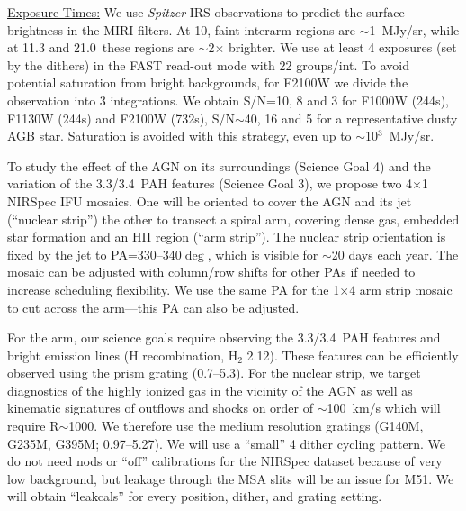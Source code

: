 \documentclass[12pt]{article}
\begin{document}
\vspace{0.05in}

\noindent \underline{Exposure Times:} We use {\em Spitzer} IRS observations to predict the surface brightness in the MIRI filters. At 10\micron, faint interarm regions are $\sim$1~MJy/sr, while at 11.3 and 21.0\micron\ these regions are $\sim$2$\times$ brighter.  We use at least 4 exposures (set by the dithers) in the FAST read-out mode with 22 groups/int. To avoid potential saturation from bright backgrounds, for F2100W we divide the observation into 3 integrations. We obtain S/N=10, 8 and 3 for F1000W (244s), F1130W (244s) and F2100W (732s), S/N$\sim$40, 16 and 5 for a representative dusty AGB star.  Saturation is avoided with this strategy, even up to $\sim$10$^3$~MJy/sr.

\vspace{0.1in}

 To study the effect of the AGN on its surroundings (Science Goal 4) and the variation of the 3.3/3.4\micron\ PAH features (Science Goal 3), we propose two 4$\times$1 NIRSpec IFU mosaics. One will be oriented to cover the AGN and its jet (``nuclear strip'') the other to transect a spiral arm, covering dense gas, embedded star formation and an H{\small II} region (``arm strip''). The nuclear strip orientation is fixed by the jet to PA=330--340$\deg$, which is visible for $\sim$20 days each year. The mosaic can be adjusted with column/row shifts for other PAs if needed to increase scheduling flexibility. We use the same PA for the 1$\times$4 arm strip mosaic to cut across the arm---this PA can also be adjusted.

For the arm, our science goals require observing the 3.3/3.4\micron\ PAH features and bright emission lines (H recombination, H$_2$ 2.12\micron). These features can be efficiently observed using the prism grating (0.7--5.3\micron).  For the nuclear strip, we target diagnostics of the highly ionized gas in the vicinity of the AGN as well as kinematic signatures of outflows and shocks on order of $\sim$100~km/s which will require R$\sim$1000. We therefore use the medium resolution gratings (G140M, G235M, G395M; 0.97--5.27\micron). We will use a ``small'' 4 dither cycling pattern.  We do not need nods or ``off'' calibrations for the NIRSpec dataset because of very low background, but leakage through the MSA slits will be an issue for M51. We will obtain ``leakcals'' for every position, dither, and grating setting. 

\vspace{0.05in}
\end{document}

